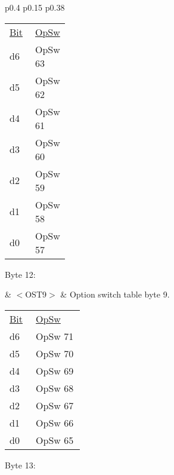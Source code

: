 \begin{tabular}{p{0.4\linewidth} p{0.15\linewidth} p{0.38\linewidth}} 

\begin{tabular}{|p{0.3cm}|p{0.3cm}|p{0.3cm}|p{0.3cm}|p{0.3cm}|p{0.3cm}|p{0.3cm}|p{0.3cm}|}
\hline
0 & d6 & d5 & d4 & d3 & d2 & d1 & d0\\
\hline
\end{tabular}
& $<$OST8$>$ & Option switch table byte 8.\\
\end{tabular}

\begin{tabular}{p{0.05\linewidth} p{0.2\linewidth} } 
\underline{Bit} & \underline{OpSw} \\
d6 & OpSw 63\\
d5 & OpSw 62\\
d4 & OpSw 61\\
d3 & OpSw 60\\
d2 & OpSw 59\\
d1 & OpSw 58\\
d0 & OpSw 57\\
\end{tabular}

Byte 12:

& $<$OST9$>$ & Option switch table byte 9.\\
\end{tabular}

\begin{tabular}{p{0.05\linewidth} p{0.2\linewidth} } 
\underline{Bit} & \underline{OpSw} \\
d6 & OpSw 71\\
d5 & OpSw 70\\
d4 & OpSw 69\\
d3 & OpSw 68\\
d2 & OpSw 67\\
d1 & OpSw 66\\
d0 & OpSw 65\\
\end{tabular}

Byte 13:

